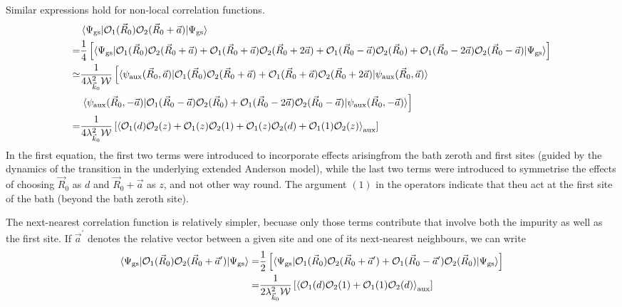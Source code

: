 \documentclass{report}
\numberwithin{equation}{section}
\begin{document}
Similar expressions hold for non-local correlation functions.
\begin{equation}\begin{aligned}
	\label{nonlocal_correlation}
	&\braket{\Psi_\text{gs} | \mathcal{O}_1(\vec R_0) \mathcal{O}_2(\vec R_0 + \vec a) | \Psi_\text{gs}} \\
	=& \frac{1}{4}\left[\braket{\Psi_\text{gs} | \mathcal{O}_1(\vec R_0) \mathcal{O}_2(\vec R_0 + \vec a) + \mathcal{O}_1(\vec R_0 + \vec a) \mathcal{O}_2(\vec R_0 + 2\vec a) + \mathcal{O}_1(\vec R_0 - \vec a) \mathcal{O}_2(\vec R_0) + \mathcal{O}_1(\vec R_0 - 2\vec a) \mathcal{O}_2(\vec R_0 - \vec a) | \Psi_\text{gs}}\right]\\
	\simeq& \frac{1}{4\lambda_{\vec k_0}^2 \mathcal{W}}\left[\braket{\psi_\text{aux}(\vec R_0, \vec a) | \mathcal{O}_1(\vec R_0) \mathcal{O}_2(\vec R_0 + \vec a) + \mathcal{O}_1(\vec R_0 + \vec a) \mathcal{O}_2(\vec R_0 + 2\vec a) | \psi_\text{aux}(\vec R_0, \vec a)} \right. \\
	      &\left.\braket{\psi_\text{aux}(\vec R_0, -\vec a) | \mathcal{O}_1(\vec R_0 - \vec a) \mathcal{O}_2(\vec R_0) + \mathcal{O}_1(\vec R_0 - 2\vec a) \mathcal{O}_2(\vec R_0 - \vec a) | \psi_\text{aux}(\vec R_0, -\vec a)}\right]\\
	=& \frac{1}{4\lambda_{\vec k_0}^2 \mathcal{W}}\left[\braket{\mathcal{O}_1(d) \mathcal{O}_2(z) + \mathcal{O}_1(z) \mathcal{O}_2(1) + \mathcal{O}_1(z) \mathcal{O}_2(d) + \mathcal{O}_1(1) \mathcal{O}_2(z)}_\text{aux}\right]
\end{aligned}\end{equation}
In the first equation, the first two terms were introduced to incorporate effects arisingfrom the bath zeroth and first sites (guided by the dynamics of the transition in the underlying extended Anderson model), while the last two terms were introduced to symmetrise the effects of choosing \(\vec R_0\) as \(d\) and \(\vec R_0 + \vec a\) as \(z\), and not other way round. The argument \((1)\) in the operators indicate that theu act at the first site of the bath (beyond the bath zeroth site).

The next-nearest correlation function is relatively simpler, becuase only those terms contribute that involve both the impurity as well as the first site. If \(\vec a^\prime\) denotes the relative vector between a given site and one of its next-nearest neighbours, we can write
\begin{equation}\begin{aligned}
	\label{nnn_correlation}
	\braket{\Psi_\text{gs} | \mathcal{O}_1(\vec R_0) \mathcal{O}_2(\vec R_0 + \vec a^\prime) | \Psi_\text{gs}} =& \frac{1}{2}\left[\braket{\Psi_\text{gs} | \mathcal{O}_1(\vec R_0) \mathcal{O}_2(\vec R_0 + \vec a^\prime) + \mathcal{O}_1(\vec R_0 - \vec a^\prime) \mathcal{O}_2(\vec R_0) | \Psi_\text{gs}}\right]\\
	=& \frac{1}{2\lambda_{\vec k_0}^2 \mathcal{W}}\left[\braket{\mathcal{O}_1(d) \mathcal{O}_2(1) + \mathcal{O}_1(1) \mathcal{O}_2(d)}_\text{aux}\right]
\end{aligned}\end{equation}
\end{document}
